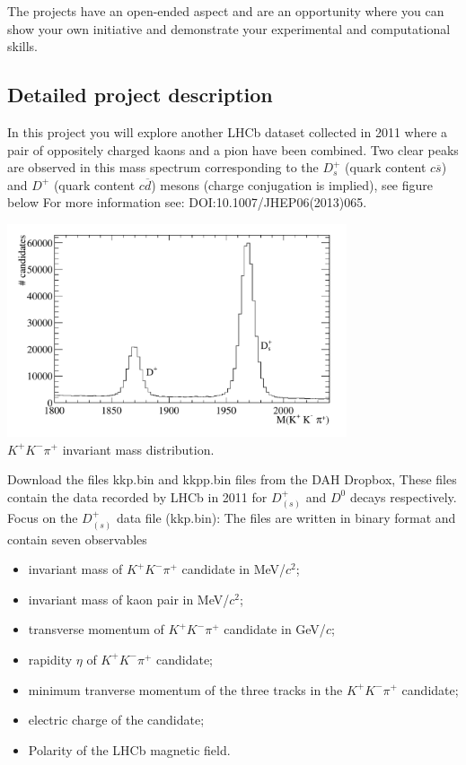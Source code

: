 The projects have an open-ended aspect and are an opportunity where you can show your own initiative and demonstrate your experimental and computational skills.



\subsection{Detailed project description}
 
In this project you will explore another LHCb dataset collected in 2011 where a pair of
oppositely charged kaons and a pion have been combined. Two clear
peaks are observed in this mass spectrum corresponding to the $D_s^+$ (quark content $c\overline{s}$)
and $D^+$ (quark content $c\overline{d}$) mesons (charge conjugation is implied), see figure below %
For more information see: {DOI:10.1007/JHEP06(2013)065}. 
%
\begin{center}
\includegraphics[width=0.75\textwidth]{figs/KKpi.pdf}\\
{\small $K^{+}K^{-}\pi^{+}$ invariant mass distribution.}
\end{center}
%

Download the files kkp.bin and kkpp.bin files  from the DAH Dropbox, 
These files contain the data recorded by LHCb in 2011 for $D_{(s)}^+$ and $D^0$ decays respectively. Focus on the $D_{(s)}^+$ data file (kkp.bin):
The files are written in binary format and contain seven observables
\begin{itemize}
\item  invariant mass of $K^{+}K^{-}\pi^{+}$  candidate  in  MeV/$c^2$;
\item  invariant mass of kaon pair in   MeV/$c^2$;
\item transverse momentum of  $K^{+}K^{-}\pi^{+}$  candidate  in GeV/$c$;
\item rapidity $\eta$ of $K^{+}K^{-}\pi^{+}$  candidate;
\item minimum tranverse momentum of the three tracks in the $K^{+}K^{-}\pi^{+}$  candidate;
\item electric charge of the candidate;
\item Polarity of the LHCb magnetic field.
\end{itemize}

